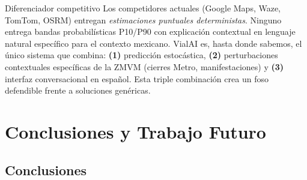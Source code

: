 \documentclass[11pt,a4paper]{article}
\begin{document}
\begin{insightbox}{Diferenciador competitivo}
Los competidores actuales (Google Maps, Waze, TomTom, OSRM) entregan \textit{estimaciones puntuales deterministas}. Ninguno entrega bandas probabilísticas P10/P90 con explicación contextual en lenguaje natural específico para el contexto mexicano. VialAI es, hasta donde sabemos, el único sistema que combina: \textbf{(1)} predicción estocástica, \textbf{(2)} perturbaciones contextuales específicas de la ZMVM (cierres Metro, manifestaciones) y \textbf{(3)} interfaz conversacional en español. Esta triple combinación crea un foso defendible frente a soluciones genéricas.
\end{insightbox}

\section{Conclusiones y Trabajo Futuro}

\subsection{Conclusiones}
\end{document}
